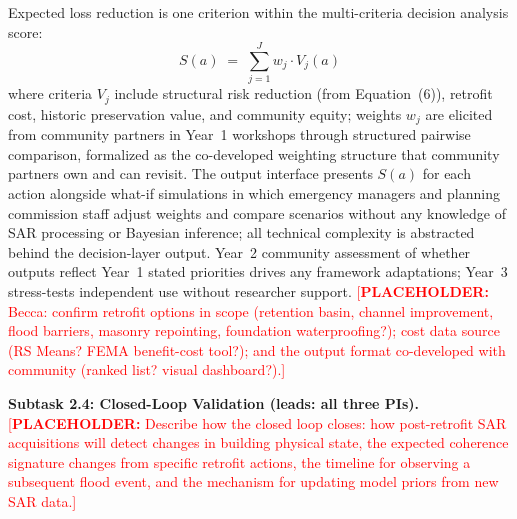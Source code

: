 \documentclass[11pt]{article}
\newcommand{\placeholder}[1]{\textcolor{red}{[\textbf{PLACEHOLDER:} #1]}}
\begin{document}
Expected loss reduction is one criterion within the multi-criteria decision analysis score:
\begin{equation}
  S(a) \;=\; \sum_{j=1}^{J} w_j \cdot V_j(a)
\end{equation}
where criteria $V_j$ include structural risk reduction (from Equation~(6)), retrofit cost, historic preservation value, and community equity; weights $w_j$ are elicited from community partners in Year~1 workshops through structured pairwise comparison, formalized as the co-developed weighting structure that community partners own and can revisit.
The output interface presents $S(a)$ for each action alongside what-if simulations in which emergency managers and planning commission staff adjust weights and compare scenarios without any knowledge of SAR processing or Bayesian inference; all technical complexity is abstracted behind the decision-layer output.
Year~2 community assessment of whether outputs reflect Year~1 stated priorities drives any framework adaptations; Year~3 stress-tests independent use without researcher support.
\placeholder{Becca: confirm retrofit options in scope (retention basin, channel improvement, flood barriers, masonry repointing, foundation waterproofing?); cost data source (RS Means? FEMA benefit-cost tool?); and the output format co-developed with community (ranked list? visual dashboard?).}

\textbf{Subtask 2.4: Closed-Loop Validation (leads: all three PIs).}
\placeholder{Describe how the closed loop closes: how post-retrofit SAR acquisitions will detect changes in building physical state, the expected coherence signature changes from specific retrofit actions, the timeline for observing a subsequent flood event, and the mechanism for updating model priors from new SAR data.}
\end{document}
